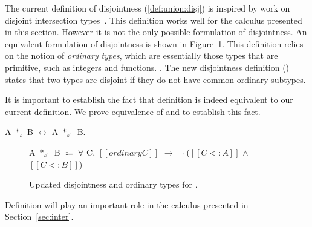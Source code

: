 The current definition of disjointness (\cref{def:union:disj}) is inspired
by work on disjoint intersection types~\cite{oliveira2016disjoint}. This definition works well
for the calculus presented in this section. However it is not the only
possible formulation of disjointness.
An equivalent formulation of disjointness is shown in Figure~\ref{fig:union:ord}.
This definition relies on the notion of \emph{ordinary types}, which are essentially
those types that are primitive, such as integers and functions.
. 
The new disjointness definition () states that two
types are disjoint if they do not have common ordinary subtypes.

It is important to establish the fact that definition
 is indeed equivalent to our current
definition. We prove equivalence of  and
 to establish this fact.

\begin{lemma}
A $*_{s}$ B $\longleftrightarrow$ A $*_{s1}$ B.
\end{lemma}

\begin{figure}
    \centering
  \medskip
  \begin{definition}
    \centering
    A $*_{s1}$ B $\Coloneqq$ $\forall$ C, $[[ordinary C]]$ $\rightarrow$ $\neg$ ($[[C <: A]]$ $\wedge$ $[[C <: B]]$)
    \label{def:union:disj1}
  \end{definition}
  \caption{Updated disjointness and ordinary types for \cal.
     }
  \label{fig:union:ord}
\end{figure}

Definition  will play an important role in the
calculus presented in Section~\ref{sec:inter}.
